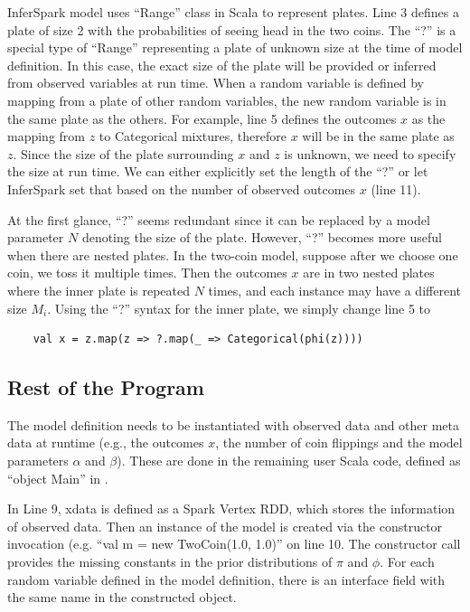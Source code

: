 InferSpark model uses ``Range'' class in Scala to represent plates. Line 3
defines a plate of size 2 with the probabilities of seeing head in the 
two coins. The ``?'' is a special type of ``Range'' representing 
a plate of unknown size at the time of model definition. 
In this case, the exact size of the plate will be provided or inferred
from observed variables at run time.  When a random variable is
defined by mapping from a plate of other random variables, 
the new random variable is in the same plate as the others.  
For example, line 5 defines the outcomes $x$ as the mapping from $z$ 
to Categorical mixtures, therefore $x$ will be in the same plate as
$z$. Since the size of the plate surrounding $x$ and $z$ is unknown, we need
to specify the size at run time.  We can either explicitly set the length of
the ``?'' or let InferSpark set that based on the number of observed outcomes
$x$ (line 11).

At the first glance, ``?'' seems redundant since it can be replaced by a
model parameter $N$ denoting the size of the plate.  However, ``?'' becomes
more useful when there are nested plates. In the two-coin model, suppose
after we choose one coin, we toss it multiple times. 
Then the outcomes $x$ are in two nested plates where the inner plate is
repeated $N$ times, and each instance may have
a different size $M_i$. Using the ``?'' syntax
for the inner plate, we simply change line 5 to

{\small\begin{verbatim}
	val x = z.map(z => ?.map(_ => Categorical(phi(z))))	
\end{verbatim}
}


\subsection{Rest of the Program}
The model definition needs to be instantiated with observed data and
other meta data at runtime (e.g., the outcomes $x$, the number of coin flippings
and the model parameters $\alpha$ and $\beta$). These are done in the
remaining user Scala code, defined  as ``{\sf object Main}'' in
.

In Line 9, {\sf xdata} is defined as a Spark Vertex RDD, which stores the information of 
observed data. 
Then an instance of the model is created via the constructor invocation (e.g.
``{\sf val m = new TwoCoin(1.0, 1.0)}'' on line 10. 
The constructor call provides
the missing constants in the prior distributions of $\pi$ and $\phi$.
For each random variable defined in the model definition,
there is an interface field with the
same name in the constructed object. 

